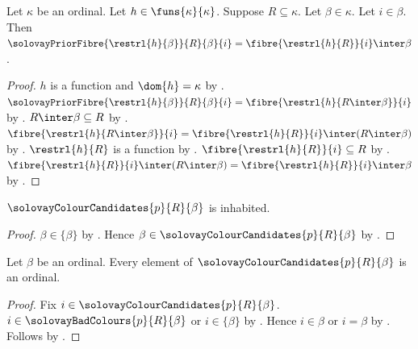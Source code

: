 \begin{proposition}\label{solovay_prior_global_fibre}
    Let $\kappa$ be an ordinal.
    Let $h\in\funs{\kappa}{\kappa}$.
    Suppose $R\subseteq\kappa$.
    Let $\beta\in\kappa$.
    Let $i\in\beta$.
    Then $\solovayPriorFibre{\restrl{h}{\beta}}{R}{\beta}{i}
        =\fibre{\restrl{h}{R}}{i}\inter\beta$.
\end{proposition}
\begin{proof}
    $h$ is a function and $\dom{h}=\kappa$
        by .
    $\solovayPriorFibre{\restrl{h}{\beta}}{R}{\beta}{i}
        =\fibre{\restrl{h}{R\inter\beta}}{i}$
        by .
    $R\inter\beta\subseteq R$ by .
    $\fibre{\restrl{h}{R\inter\beta}}{i}
        =\fibre{\restrl{h}{R}}{i}\inter(R\inter\beta)$
        by .
    $\restrl{h}{R}$ is a function
        by .
    $\fibre{\restrl{h}{R}}{i}\subseteq R$
        by .
    $\fibre{\restrl{h}{R}}{i}\inter(R\inter\beta)
        =\fibre{\restrl{h}{R}}{i}\inter\beta$
        by .
\end{proof}

\begin{proposition}\label{solovay_colour_candidates_inhabited}
    $\solovayColourCandidates{p}{R}{\beta}$ is inhabited.
\end{proposition}
\begin{proof}
    $\beta\in\{\beta\}$ by .
    Hence $\beta\in\solovayColourCandidates{p}{R}{\beta}$
        by .
\end{proof}

\begin{proposition}\label{solovay_colour_candidates_are_ordinals}
    Let $\beta$ be an ordinal.
    Every element of $\solovayColourCandidates{p}{R}{\beta}$ is an ordinal.
\end{proposition}
\begin{proof}
    Fix $i\in\solovayColourCandidates{p}{R}{\beta}$.
    $i\in\solovayBadColours{p}{R}{\beta}$ or $i\in\{\beta\}$
        by .
    Hence $i\in\beta$ or $i=\beta$
        by .
    Follows by .
\end{proof}

